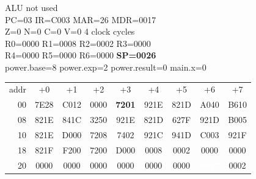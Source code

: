 \begin{tcolorbox}[stepbox, title={Step 7 \hfill PC 16 \quad CALL power}]
\textcolor{dim}{ALU} \textcolor{dim}{not used}\\
PC=03 IR=C003 MAR=26 MDR=0017\\
Z=0 N=0 C=0 V=0 \hfill \textcolor{dim}{4 clock cycles}\\
R0=0000 R1=0008 R2=0002 R3=0000\\
R4=0000 R5=0000 R6=0000 \textcolor{wrt}{\textbf{SP=0026}}\\
\textcolor{dim}{power.base=8  power.exp=2  power.result=0  main.x=0}\\[1pt]
{\setlength{\tabcolsep}{1.6pt}\begin{tabular}{@{}r*{8}{c}@{}}
\textcolor{dim}{addr} & \textcolor{dim}{+0} & \textcolor{dim}{+1} & \textcolor{dim}{+2} & \textcolor{dim}{+3} & \textcolor{dim}{+4} & \textcolor{dim}{+5} & \textcolor{dim}{+6} & \textcolor{dim}{+7}\\
\textcolor{dim}{00} & 7E28 & C012 & 0000 & \cellcolor{pcc}\textbf{7201} & 921E & 821D & A040 & B610\\
\textcolor{dim}{08} & 821E & 841C & 3250 & 921E & 821D & 627F & 921D & B005\\
\textcolor{dim}{10} & 821E & D000 & 7208 & 7402 & 921C & 941D & C003 & 921F\\
\textcolor{dim}{18} & 821F & F200 & 7200 & D000 & \cellcolor{datac}0008 & \cellcolor{datac}0002 & \cellcolor{datac}0000 & \cellcolor{datac}0000\\
\textcolor{dim}{20} & \cellcolor{stackc}0000 & \cellcolor{stackc}0000 & \cellcolor{stackc}0000 & \cellcolor{stackc}0000 & \cellcolor{stackc}0000 & \cellcolor{stackc}0000 & \cellcolor{wrt}\textcolor{white}{\textbf{0017}} & \cellcolor{stackc}0002\\
\end{tabular}}
\end{tcolorbox}\par\vspace{3pt}
